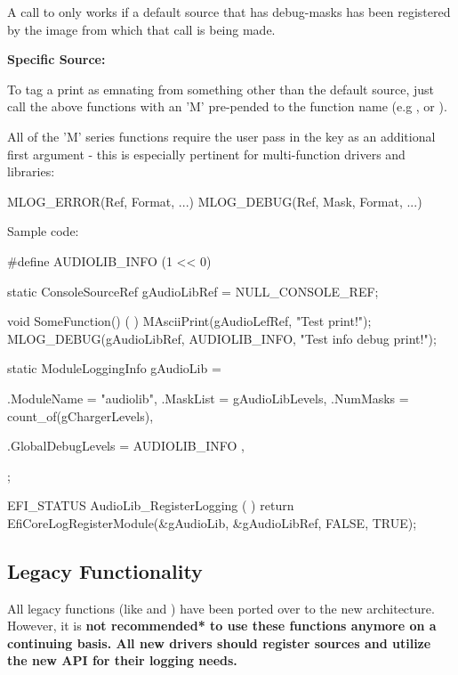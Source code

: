 \begin{Note}
A call to  only works if a default source that has debug-masks has been registered by the image from which 
that call is being made. 
\end{Note}

\bigskip
\bfseries Specific Source:
\mdseries

To tag a print as emnating from something other than the default source, just call the above functions with an 'M' pre-pended to the
function name (e.g ,  or ).

All of the 'M' series functions require the user pass in the  key as an additional first argument - this is 
especially pertinent for multi-function drivers and libraries:

\begin{Struct}
MLOG_ERROR(Ref, Format, ...)
MLOG_DEBUG(Ref, Mask, Format, ...)
\end{Struct}

Sample code:

\begin{SampleCode}
#define AUDIOLIB_INFO    (1 << 0)

static ConsoleSourceRef gAudioLibRef = NULL_CONSOLE_REF;

void
SomeFunction() (
    )
{
    MAsciiPrint(gAudioLefRef, "Test print!\n");
    MLOG_DEBUG(gAudioLibRef, AUDIOLIB_INFO, "Test info debug print!\n");
}

static ModuleLoggingInfo gAudioLib = {
    .ModuleName = "audiolib",
    .MaskList = gAudioLibLevels,
    .NumMasks = count_of(gChargerLevels),

    .GlobalDebugLevels = {
        AUDIOLIB_INFO
    },
};

EFI_STATUS 
AudioLib_RegisterLogging (
    )
{
    return EfiCoreLogRegisterModule(&gAudioLib, &gAudioLibRef, FALSE, TRUE);
}
\end{SampleCode}

\subsection{Legacy Functionality}

All legacy functions (like  and ) have been ported over to the new architecture. 
However, it is \bfseries *not recommended* \mdseries to use these functions anymore on a continuing basis. All new drivers should register
sources and utilize the new API for their logging needs. 

